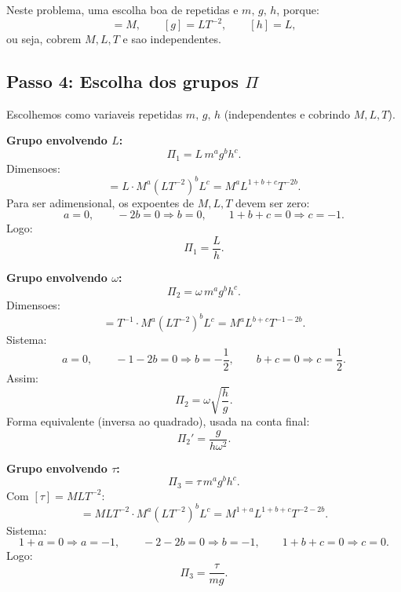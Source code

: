 \documentclass[12pt,a4paper]{article}
\begin{document}
Neste problema, uma escolha boa de repetidas e $m,\,g,\,h$, porque:
\begin{equation}
[m]=M,\qquad [g]=LT^{-2},\qquad [h]=L,
\end{equation}
ou seja, cobrem $M,L,T$ e sao independentes.

\subsection*{Passo 4: Escolha dos grupos $\Pi$}
Escolhemos como variaveis repetidas $m,\,g,\,h$ (independentes e cobrindo $M,L,T$).

\textbf{Grupo envolvendo $L$:}
\begin{equation}
\Pi_1 = L\,m^{a}g^{b}h^{c}.
\end{equation}
Dimensoes:
\begin{equation}
[\Pi_1]=L\cdot M^{a}(LT^{-2})^{b}L^{c}=M^aL^{1+b+c}T^{-2b}.
\end{equation}
Para ser adimensional, os expoentes de $M,L,T$ devem ser zero:
\begin{equation}
a=0,\qquad -2b=0\Rightarrow b=0,\qquad 1+b+c=0\Rightarrow c=-1.
\end{equation}
Logo:
\begin{equation}
\Pi_1=\frac{L}{h}.
\end{equation}

\textbf{Grupo envolvendo $\omega$:}
\begin{equation}
\Pi_2 = \omega\,m^{a}g^{b}h^{c}.
\end{equation}
Dimensoes:
\begin{equation}
[\Pi_2]=T^{-1}\cdot M^{a}(LT^{-2})^{b}L^{c}=M^aL^{b+c}T^{-1-2b}.
\end{equation}
Sistema:
\begin{equation}
a=0,\qquad -1-2b=0\Rightarrow b=-\frac12,\qquad b+c=0\Rightarrow c=\frac12.
\end{equation}
Assim:
\begin{equation}
\Pi_2=\omega\sqrt{\frac{h}{g}}.
\end{equation}
Forma equivalente (inversa ao quadrado), usada na conta final:
\begin{equation}
\Pi_2' = \frac{g}{h\omega^2}.
\end{equation}

\textbf{Grupo envolvendo $\tau$:}
\begin{equation}
\Pi_3 = \tau\,m^{a}g^{b}h^{c}.
\end{equation}
Com $[\tau]=MLT^{-2}$:
\begin{equation}
[\Pi_3]=MLT^{-2}\cdot M^{a}(LT^{-2})^{b}L^{c}
=M^{1+a}L^{1+b+c}T^{-2-2b}.
\end{equation}
Sistema:
\begin{equation}
1+a=0\Rightarrow a=-1,
\qquad
-2-2b=0\Rightarrow b=-1,
\qquad
1+b+c=0\Rightarrow c=0.
\end{equation}
Logo:
\begin{equation}
\Pi_3=\frac{\tau}{mg}.
\end{equation}
\end{document}
